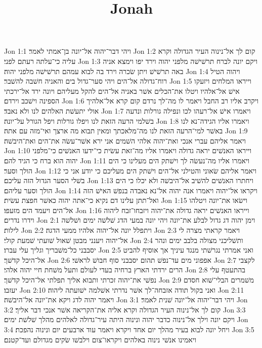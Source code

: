 

\title{Jonah}

Jon 1:1  ויהי דבר־יהוה אל־יונה בן־אמתי לאמר׃
Jon 1:2  קום לך אל־נינוה העיר הגדולה וקרא עליה כי־עלתה רעתם לפני׃
Jon 1:3  ויקם יונה לברח תרשׁישׁה מלפני יהוה וירד יפו וימצא אניה באה תרשׁישׁ ויתן שׂכרה וירד בה לבוא עמהם תרשׁישׁה מלפני יהוה׃
Jon 1:4  ויהוה הטיל רוח־גדולה אל־הים ויהי סער־גדול בים והאניה חשׁבה להשׁבר׃
Jon 1:5  וייראו המלחים ויזעקו אישׁ אל־אלהיו ויטלו את־הכלים אשׁר באניה אל־הים להקל מעליהם ויונה ירד אל־ירכתי הספינה וישׁכב וירדם׃
Jon 1:6  ויקרב אליו רב החבל ויאמר לו מה־לך נרדם קום קרא אל־אלהיך אולי יתעשׁת האלהים לנו ולא נאבד׃
Jon 1:7  ויאמרו אישׁ אל־רעהו לכו ונפילה גורלות ונדעה בשׁלמי הרעה הזאת לנו ויפלו גורלות ויפל הגורל על־יונה׃
Jon 1:8  ויאמרו אליו הגידה־נא לנו באשׁר למי־הרעה הזאת לנו מה־מלאכתך ומאין תבוא מה ארצך ואי־מזה עם אתה׃
Jon 1:9  ויאמר אליהם עברי אנכי ואת־יהוה אלהי השׁמים אני ירא אשׁר־עשׂה את־הים ואת־היבשׁה׃
Jon 1:10  וייראו האנשׁים יראה גדולה ויאמרו אליו מה־זאת עשׂית כי־ידעו האנשׁים כי־מלפני יהוה הוא ברח כי הגיד להם׃
Jon 1:11  ויאמרו אליו מה־נעשׂה לך וישׁתק הים מעלינו כי הים הולך וסער׃
Jon 1:12  ויאמר אליהם שׂאוני והטילני אל־הים וישׁתק הים מעליכם כי יודע אני כי בשׁלי הסער הגדול הזה עליכם׃
Jon 1:13  ויחתרו האנשׁים להשׁיב אל־היבשׁה ולא יכלו כי הים הולך וסער עליהם׃
Jon 1:14  ויקראו אל־יהוה ויאמרו אנה יהוה אל־נא נאבדה בנפשׁ האישׁ הזה ואל־תתן עלינו דם נקיא כי־אתה יהוה כאשׁר חפצת עשׂית׃
Jon 1:15  וישׂאו את־יונה ויטלהו אל־הים ויעמד הים מזעפו׃
Jon 1:16  וייראו האנשׁים יראה גדולה את־יהוה ויזבחו־זבח ליהוה וידרו נדרים׃
Jon 2:1  וימן יהוה דג גדול לבלע את־יונה ויהי יונה במעי הדג שׁלשׁה ימים ושׁלשׁה לילות׃
Jon 2:2  ויתפלל יונה אל־יהוה אלהיו ממעי הדגה׃
Jon 2:3  ויאמר קראתי מצרה לי אל־יהוה ויענני מבטן שׁאול שׁועתי שׁמעת קולי׃
Jon 2:4  ותשׁליכני מצולה בלבב ימים ונהר יסבבני כל־משׁבריך וגליך עלי עברו׃
Jon 2:5  ואני אמרתי נגרשׁתי מנגד עיניך אך אוסיף להביט אל־היכל קדשׁך׃
Jon 2:6  אפפוני מים עד־נפשׁ תהום יסבבני סוף חבושׁ לראשׁי׃
Jon 2:7  לקצבי הרים ירדתי הארץ ברחיה בעדי לעולם ותעל משׁחת חיי יהוה אלהי׃
Jon 2:8  בהתעטף עלי נפשׁי את־יהוה זכרתי ותבוא אליך תפלתי אל־היכל קדשׁך׃
Jon 2:9  משׁמרים הבלי־שׁוא חסדם יעזבו׃
Jon 2:10  ואני בקול תודה אזבחה־לך אשׁר נדרתי אשׁלמה ישׁועתה ליהוה׃
Jon 2:11  ויאמר יהוה לדג ויקא את־יונה אל־היבשׁה׃
Jon 3:1  ויהי דבר־יהוה אל־יונה שׁנית לאמר׃
Jon 3:2  קום לך אל־נינוה העיר הגדולה וקרא אליה את־הקריאה אשׁר אנכי דבר אליך׃
Jon 3:3  ויקם יונה וילך אל־נינוה כדבר יהוה ונינוה היתה עיר־גדולה לאלהים מהלך שׁלשׁת ימים׃
Jon 3:4  ויחל יונה לבוא בעיר מהלך יום אחד ויקרא ויאמר עוד ארבעים יום ונינוה נהפכת׃
Jon 3:5  ויאמינו אנשׁי נינוה באלהים ויקראו־צום וילבשׁו שׂקים מגדולם ועד־קטנם׃
